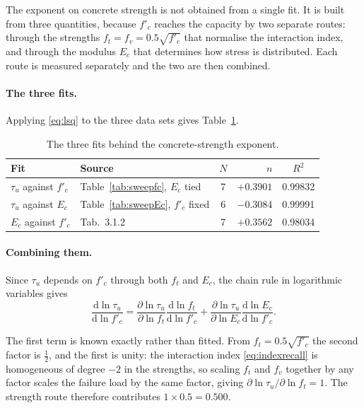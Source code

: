 The exponent on concrete strength is not obtained from a single fit. It is
built from three quantities, because $f'_c$ reaches the capacity by two
separate routes: through the strengths $f_t = f_v = 0.5\sqrt{f'_c}$ that
normalise the interaction index, and through the modulus $E_c$ that
determines how stress is distributed. Each route is measured separately
and the two are then combined.

\paragraph{The three fits.}
Applying \eqref{eq:lsq} to the three data sets gives
Table~\ref{tab:fcfits}.

\begin{table}[H]
\centering
\caption{The three fits behind the concrete-strength exponent.}
\label{tab:fcfits}
\small
\begin{tabular*}{\linewidth}{@{\extracolsep{\fill}}llcrc@{}}
\hline
Fit & Source & $N$ & $n$ & $R^2$ \\
\hline
$\tau_u$ against $f'_c$ & Table~\ref{tab:sweepfc}, $E_c$ tied & 7
  & $+0.3901$ & 0.99832 \\
$\tau_u$ against $E_c$  & Table~\ref{tab:sweepEc}, $f'_c$ fixed & 6
  & $-0.3084$ & 0.99991 \\
$E_c$ against $f'_c$    & \textcite{as3600ConcreteStructures2018} Tab.~3.1.2 & 7
  & $+0.3562$ & 0.98034 \\
\hline
\end{tabular*}
\end{table}

\paragraph{Combining them.}
Since $\tau_u$ depends on $f'_c$ through both $f_t$ and $E_c$, the chain
rule in logarithmic variables gives
\begin{equation}
\label{eq:chain}
\frac{\mathrm{d}\ln \tau_u}{\mathrm{d}\ln f'_c}
  = \frac{\partial \ln \tau_u}{\partial \ln f_t}
    \frac{\mathrm{d}\ln f_t}{\mathrm{d}\ln f'_c}
  + \frac{\partial \ln \tau_u}{\partial \ln E_c}
    \frac{\mathrm{d}\ln E_c}{\mathrm{d}\ln f'_c} .
\end{equation}

The first term is known exactly rather than fitted. From
$f_t = 0.5\sqrt{f'_c}$ the second factor is $\tfrac12$, and the first is
unity: the interaction index \eqref{eq:indexrecall} is homogeneous of
degree $-2$ in the strengths, so scaling $f_t$ and $f_v$ together by any
factor scales the failure load by the same factor, giving
$\partial \ln \tau_u / \partial \ln f_t = 1$. The strength route therefore
contributes $1 \times 0.5 = 0.500$.

